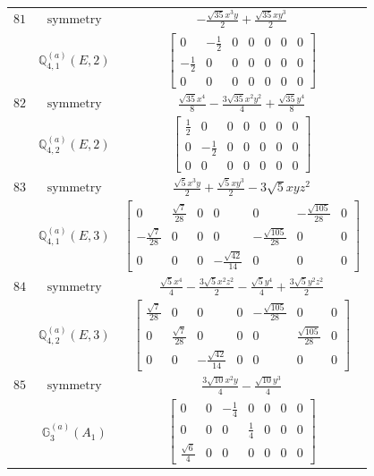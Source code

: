 \documentclass[fleqn,8pt,landscape]{jsarticle}
\begin{document}
\begin{longtable}{ccc}
$ 81 $ & $ \text{symmetry} $ & $ - \frac{\sqrt{35} x^{3} y}{2} + \frac{\sqrt{35} x y^{3}}{2} $ \\
$  $ & $ \mathbb{Q}_{4,1}^{(a)}(E,2) $ & $ \begin{bmatrix} 0 & - \frac{1}{2} & 0 & 0 & 0 & 0 & 0 \\ - \frac{1}{2} & 0 & 0 & 0 & 0 & 0 & 0 \\ 0 & 0 & 0 & 0 & 0 & 0 & 0 \end{bmatrix} $ \\ \hline
$ 82 $ & $ \text{symmetry} $ & $ \frac{\sqrt{35} x^{4}}{8} - \frac{3 \sqrt{35} x^{2} y^{2}}{4} + \frac{\sqrt{35} y^{4}}{8} $ \\
$  $ & $ \mathbb{Q}_{4,2}^{(a)}(E,2) $ & $ \begin{bmatrix} \frac{1}{2} & 0 & 0 & 0 & 0 & 0 & 0 \\ 0 & - \frac{1}{2} & 0 & 0 & 0 & 0 & 0 \\ 0 & 0 & 0 & 0 & 0 & 0 & 0 \end{bmatrix} $ \\ \hline
$ 83 $ & $ \text{symmetry} $ & $ \frac{\sqrt{5} x^{3} y}{2} + \frac{\sqrt{5} x y^{3}}{2} - 3 \sqrt{5} x y z^{2} $ \\
$  $ & $ \mathbb{Q}_{4,1}^{(a)}(E,3) $ & $ \begin{bmatrix} 0 & \frac{\sqrt{7}}{28} & 0 & 0 & 0 & - \frac{\sqrt{105}}{28} & 0 \\ - \frac{\sqrt{7}}{28} & 0 & 0 & 0 & - \frac{\sqrt{105}}{28} & 0 & 0 \\ 0 & 0 & 0 & - \frac{\sqrt{42}}{14} & 0 & 0 & 0 \end{bmatrix} $ \\ \hline
$ 84 $ & $ \text{symmetry} $ & $ \frac{\sqrt{5} x^{4}}{4} - \frac{3 \sqrt{5} x^{2} z^{2}}{2} - \frac{\sqrt{5} y^{4}}{4} + \frac{3 \sqrt{5} y^{2} z^{2}}{2} $ \\
$  $ & $ \mathbb{Q}_{4,2}^{(a)}(E,3) $ & $ \begin{bmatrix} \frac{\sqrt{7}}{28} & 0 & 0 & 0 & - \frac{\sqrt{105}}{28} & 0 & 0 \\ 0 & \frac{\sqrt{7}}{28} & 0 & 0 & 0 & \frac{\sqrt{105}}{28} & 0 \\ 0 & 0 & - \frac{\sqrt{42}}{14} & 0 & 0 & 0 & 0 \end{bmatrix} $ \\ \hline
$ 85 $ & $ \text{symmetry} $ & $ \frac{3 \sqrt{10} x^{2} y}{4} - \frac{\sqrt{10} y^{3}}{4} $ \\
$  $ & $ \mathbb{G}_{3}^{(a)}(A_{1}) $ & $ \begin{bmatrix} 0 & 0 & - \frac{1}{4} & 0 & 0 & 0 & 0 \\ 0 & 0 & 0 & \frac{1}{4} & 0 & 0 & 0 \\ \frac{\sqrt{6}}{4} & 0 & 0 & 0 & 0 & 0 & 0 \end{bmatrix} $ \\ \hline

\end{longtable}
\end{document}
